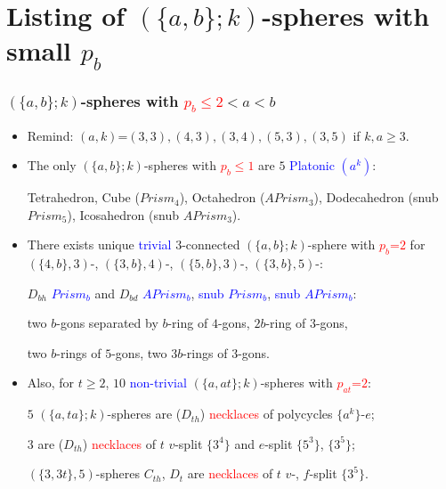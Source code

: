 \documentclass{beamer}
\begin{document}
\section[]{Listing of $(\{a,b\};k)$-spheres with small $p_b$}



\begin{frame}\frametitle{$(\{a,b\};k)$-spheres with  
\textcolor{red}{$p_b\le 2$}$<a<b$}
\vspace{-3.5mm}

\begin{itemize}
\item 
Remind:
$(a,k)$=$(3,3),(4,3),(3,4),(5,3), (3,5)$ if $k,a\ge 3$.

\item 
The only $(\{a,b\};k)$-spheres with \textcolor{red}{$p_b\le 1$} are 
$5$  \textcolor{blue}{Platonic $(a^k)$}:

Tetrahedron, Cube ($Prism_4$), Octahedron ($APrism_3$), Dodecahedron (snub 
$Prism_5$), Icosahedron (snub $APrism_3$). 

\item  
There exists unique \textcolor{blue}{trivial}
$3$-connected $(\{a,b\};k)$-sphere with \textcolor{red}{$p_b$=$2$} 
for
$(\{4,b\},3)$-, $(\{3,b\},4)$-,  $(\{5,b\},3)$-,
$(\{3,b\},5)$-:

$D_{bh}$ \textcolor{blue}{$Prism_b$}  and $D_{bd}$  
\textcolor{blue}{$APrism_b$}, 
\textcolor{blue}{snub $Prism_b$}, \textcolor{blue}{snub $APrism_b$}:   

two
$b$-gons separated by $b$-ring
of $4$-gons, $2b$-ring
of $3$-gons, 

two $b$-rings of $5$-gons, two $3b$-rings of $3$-gons.


\item 
Also, for $t$$\ge$$2$, 
 $10$ 
\textcolor{blue}{non-trivial}  $(\{a,at\};k)$-spheres with 
\textcolor{red}{$p_{at}$=$2$}:

$5$ 
$(\{a,ta\};k)$-spheres are ($D_{th}$)
\textcolor{red}{necklaces} of polycycles $\{a^k\}$-$e$;

 $3$ are ($D_{th}$)  \textcolor{red}{necklaces} of $t$ $v$-split
$\{3^4\}$ and $e$-split
 $\{5^3\}$, $\{3^5\}$;                              

 $(\{3,3t\},5)$-spheres $C_{th}$, $D_t$
are \textcolor{red}{necklaces} of $t$ $v$-, $f$-split $\{3^5\}$.
\end{itemize}
\end{frame}
\end{document}
